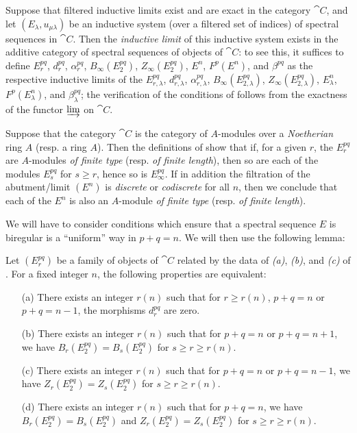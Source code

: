 \begin{env}[11.1.7]
\label{0.11.1.7}
Suppose that filtered inductive limits exist and are exact in the category $\cat{C}$, and let $(E_\lambda,u_{\mu\lambda})$ be an inductive system (over a filtered set of indices) of spectral sequences in $\cat{C}$.
Then the \emph{inductive limit} of this inductive system exists in the additive category of spectral sequences of objects of $\cat{C}$: to see this, it suffices to define $E_r^{pq}$, $d_r^{pq}$, $\alpha_r^{pq}$, $B_\infty(E_2^{pq})$, $Z_\infty(E_2^{pq})$, $E^n$, $F^p(E^n)$, and $\beta^{pq}$ as the respective inductive limits of the $E_{r,\lambda}^{pq}$, $d_{r,\lambda}^{pq}$, $\alpha_{r,\lambda}^{pq}$, $B_\infty(E_{2,\lambda}^{pq})$, $Z_\infty(E_{2,\lambda}^{pq})$, $E_\lambda^n$, $F^p(E_\lambda^n)$, and $\beta_\lambda^{pq}$; the verification of the conditions of  follows from the exactness of the functor $\varinjlim$ on $\cat{C}$.
\end{env}

\begin{remark}[11.1.8]
\label{0.11.1.8}
Suppose that the category $\cat{C}$ is the category of $A$-modules over a \emph{Noetherian} ring $A$ (resp. a ring $A$).
Then the definitions of  show that if, for a given $r$, the $E_r^{pq}$ are $A$-modules \emph{of finite type} (resp. \emph{of finite length}), then so are each of the modules $E_s^{pq}$ for $s\geq r$, hence so is $E_\infty^{pq}$.
If in addition the filtration of the abutment/limit $(E^n)$ is \emph{discrete} or \emph{codiscrete} for all $n$, then we conclude that each of the $E^n$ is also an $A$-module \emph{of finite type} (resp. \emph{of finite length}).
\end{remark}

\begin{env}[11.1.9]
\label{0.11.1.9}
We will have to consider conditions which ensure that a spectral sequence $E$ is biregular is a ``uniform'' way in $p+q=n$.
We will then use the following lemma:
\end{env}

\begin{lemma}[11.1.10]
\label{0.11.1.10}
Let $(E_r^{pq})$ be a family of objects of $\cat{C}$ related by the data of \emph{(a)}, \emph{(b)}, and \emph{(c)} of .
For a fixed integer $n$, the following properties are equivalent:
\begin{enumerate}
  \item[{\rm(a)}] There exists an integer $r(n)$ such that for $r\geq r(n)$, $p+q=n$ or $p+q=n-1$, the morphisms $d_r^{pq}$ are zero.
  \item[{\rm(b)}] There exists an integer $r(n)$ such that for $p+q=n$ or $p+q=n+1$, we have $B_r(E_2^{pq})=B_s(E_2^{pq})$ for $s\geq r\geq r(n)$.
  \item[{\rm(c)}] There exists an integer $r(n)$ such that for $p+q=n$ or $p+q=n-1$, we have $Z_r(E_2^{pq})=Z_s(E_2^{pq})$ for $s\geq r\geq r(n)$.
  \item[{\rm(d)}] There exists an integer $r(n)$ such that for $p+q=n$, we have $B_r(E_2^{pq})=B_s(E_2^{pq})$ and $Z_r(E_2^{pq})=Z_s(E_2^{pq})$ for $s\geq r\geq r(n)$.
\end{enumerate}
\end{lemma}

